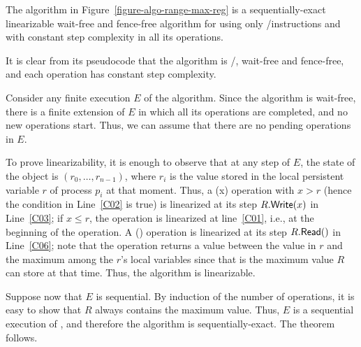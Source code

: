 \begin{theorem}\label{theo-range-max-reg}
  The algorithm in Figure~\ref{figure-algo-range-max-reg} is a sequentially-exact linearizable wait-free and fence-free algorithm for \RangeMaxReg using only \R/\W instructions and with constant step complexity in all its operations.
\end{theorem}

\begin{thesisproof}
It is clear from its pseudocode that the algorithm is \R/\W, wait-free and fence-free, and each operation has constant step complexity.

Consider any finite execution \(E\) of the algorithm. Since the algorithm is wait-free, there is a finite extension of \(E\) in which all its operations are completed, and no new operations start. Thus, we can assume that there are no pending operations in \(E\).

To prove linearizability, it is enough to observe that at any step of \(E\), the state of the object is \((r_0, \hdots, r_{n-1})\), where \(r_i\) is the value stored in the local persistent variable \(r\) of process \(p_i\) at that moment.  Thus, a \RMaxW(x) operation with \(x > r\) (hence the condition in Line~\ref{C02} is {\sf \small true}) is linearized at its step \(R.{\sf \small Write}(x)\) in Line~\ref{C03}; if \(x \leq r\), the operation is linearized at line~\ref{C01}, i.e., at the beginning of the operation.  A \RMaxR() operation is linearized at its step \(R.{\sf \small Read}()\) in Line~\ref{C06}; note that the operation returns a value between the value in \(r\) and the maximum among the \(r\)'s local variables since that is the maximum value \(R\) can store at that time. Thus, the algorithm is linearizable.

Suppose now that \(E\) is sequential. By induction of the number of operations, it is easy to show that \(R\) always contains the maximum value. Thus, \(E\) is a sequential execution of \MaxReg, and therefore the algorithm is sequentially-exact. The theorem follows.
\end{thesisproof}

